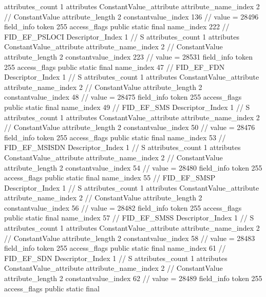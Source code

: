 {{{{{				attributes_count	1
				attributes {
				ConstantValue_attribute {
					attribute_name_index	2		// ConstantValue
					attribute_length	2
					constantvalue_index	136		// value = 28496
				}
				}
			}
			field_info {
				token	255
				access_flags	public static final
				name_index	222		// FID_EF_PSLOCI
				Descriptor_Index	1		// S
				attributes_count	1
				attributes {
				ConstantValue_attribute {
					attribute_name_index	2		// ConstantValue
					attribute_length	2
					constantvalue_index	223		// value = 28531
				}
				}
			}
			field_info {
				token	255
				access_flags	public static final
				name_index	47		// FID_EF_FDN
				Descriptor_Index	1		// S
				attributes_count	1
				attributes {
				ConstantValue_attribute {
					attribute_name_index	2		// ConstantValue
					attribute_length	2
					constantvalue_index	48		// value = 28475
				}
				}
			}
			field_info {
				token	255
				access_flags	public static final
				name_index	49		// FID_EF_SMS
				Descriptor_Index	1		// S
				attributes_count	1
				attributes {
				ConstantValue_attribute {
					attribute_name_index	2		// ConstantValue
					attribute_length	2
					constantvalue_index	50		// value = 28476
				}
				}
			}
			field_info {
				token	255
				access_flags	public static final
				name_index	53		// FID_EF_MSISDN
				Descriptor_Index	1		// S
				attributes_count	1
				attributes {
				ConstantValue_attribute {
					attribute_name_index	2		// ConstantValue
					attribute_length	2
					constantvalue_index	54		// value = 28480
				}
				}
			}
			field_info {
				token	255
				access_flags	public static final
				name_index	55		// FID_EF_SMSP
				Descriptor_Index	1		// S
				attributes_count	1
				attributes {
				ConstantValue_attribute {
					attribute_name_index	2		// ConstantValue
					attribute_length	2
					constantvalue_index	56		// value = 28482
				}
				}
			}
			field_info {
				token	255
				access_flags	public static final
				name_index	57		// FID_EF_SMSS
				Descriptor_Index	1		// S
				attributes_count	1
				attributes {
				ConstantValue_attribute {
					attribute_name_index	2		// ConstantValue
					attribute_length	2
					constantvalue_index	58		// value = 28483
				}
				}
			}
			field_info {
				token	255
				access_flags	public static final
				name_index	61		// FID_EF_SDN
				Descriptor_Index	1		// S
				attributes_count	1
				attributes {
				ConstantValue_attribute {
					attribute_name_index	2		// ConstantValue
					attribute_length	2
					constantvalue_index	62		// value = 28489
				}
				}
			}
			field_info {
				token	255
				access_flags	public static final
}}}}}
